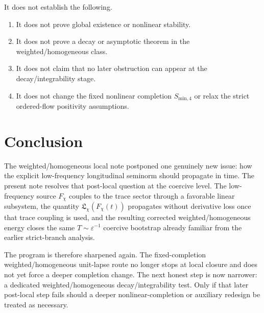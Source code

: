 \documentclass[11pt]{article}
\begin{document}
It does not establish the following.
\begin{enumerate}
    \item It does not prove global existence or nonlinear stability.
    \item It does not prove a decay or asymptotic theorem in the weighted/homogeneous class.
    \item It does not claim that no later obstruction can appear at the decay/integrability stage.
    \item It does not change the fixed nonlinear completion \(S_{\mathrm{min},4}\) or relax the strict ordered-flow positivity assumptions.
\end{enumerate}

\section{Conclusion}

The weighted/homogeneous local note postponed one genuinely new issue: how the explicit low-frequency longitudinal seminorm should propagate in time. The present note resolves that post-local question at the coercive level. The low-frequency source \(F_\chi\) couples to the trace sector through a favorable linear subsystem, the quantity \(\mathfrak L_\chi(F_\chi(t))\) propagates without derivative loss once that trace coupling is used, and the resulting corrected weighted/homogeneous energy closes the same \(T\sim \varepsilon^{-1}\) coercive bootstrap already familiar from the earlier strict-branch analysis.

The program is therefore sharpened again. The fixed-completion weighted/homogeneous unit-lapse route no longer stops at local closure and does not yet force a deeper completion change. The next honest step is now narrower: a dedicated weighted/homogeneous decay/integrability test. Only if that later post-local step fails should a deeper nonlinear-completion or auxiliary redesign be treated as necessary.
\end{document}
